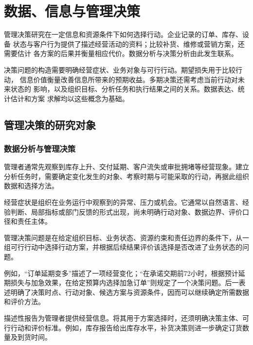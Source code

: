 \chapter{数据、信息与管理决策}
\label{ch:week01-intro}

管理决策研究在一定信息和资源条件下如何选择行动。企业记录的订单、库存、设备
状态与客户行为提供了描述经营活动的资料；比较补货、维修或营销方案，还需要估计
各方案的后果并衡量相应代价。数据分析与决策分析由此发生联系。

决策问题的构造需要明确经营症状、业务对象与可行行动。期望损失用于比较行动，
信息价值衡量改善信息所带来的预期收益。多期决策还需考虑当前行动对未来状态的
影响，以及组织目标、分析任务和执行结果之间的关系。数据表达、统计估计和方案
求解均以这些概念为基础。

\section{管理决策的研究对象}
\subsection{数据分析与管理决策}

管理者通常先观察到库存上升、交付延期、客户流失或审批拥堵等经营现象。建立分析任务时，需要确定变化发生的对象、考察时期与可能采取的行动，再据此组织数据和选择方法。

\begin{definition}[经营症状]
经营症状是组织在业务运行中观察到的异常、压力或机会。它通常以自然语言、经验判断、局部指标或部门反馈的形式出现，尚未明确行动对象、数据边界、评价口径和责任主体。
\end{definition}

\begin{definition}[管理决策问题]
管理决策问题是在给定组织目标、业务状态、资源约束和责任边界的条件下，从一组可行行动中选择行动方案，并根据后续结果评价该选择是否改进了业务状态的问题。
\end{definition}

例如，“订单延期变多”描述了一项经营变化；“在承诺交期前72小时，根据预计延期损失与加急效果，在给定预算内选择加急订单”则规定了一个决策问题。后一表述明确了决策时点、行动对象、候选方案与资源条件，因而可以继续确定所需数据和评价方法。

\begin{remark}
描述性报告为管理者提供经营信息。将其用于方案选择时，还须明确决策主体、可行行动和评价标准。例如，库存报告给出库存水平，补货决策则进一步确定订货数量及到货时间。
\end{remark}

